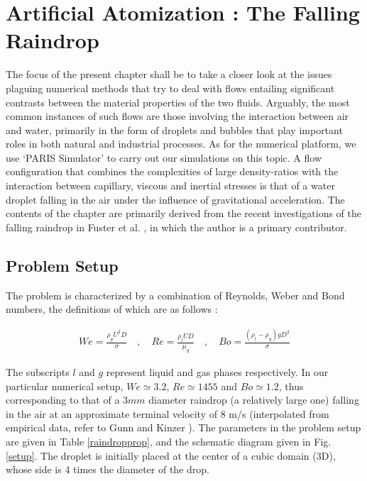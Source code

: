 \setchapterpreamble[u]{\margintoc}
\chapter{Artificial Atomization : The Falling Raindrop}

The focus of the present chapter shall be to take a closer look at the issues 
plaguing numerical methods that try to deal with flows 
entailing significant contrasts between the material 
properties of the two fluids. Arguably, the most common
instances of such flows are those involving the interaction
between air and water, primarily in the form of droplets and 
bubbles that play important roles in both natural and industrial processes. 
As for the numerical platform, we use `PARIS Simulator' 
to carry out our simulations on this topic. 
A flow configuration that combines the complexities of large 
density-ratios with the interaction between capillary, viscous and 
inertial stresses is that of a water droplet falling in the 
air under the influence of gravitational acceleration.
The contents of the chapter are primarily derived 
from the recent investigations of the falling raindrop  
in Fuster et al. , in which
the author is a primary contributor. 
\section{Problem Setup}

The problem is characterized by a combination of Reynolds, 
Weber and Bond numbers, the definitions of which are as follows : 

\begin{align}
We=\frac{\rho_{g} U^2 D}{\sigma} \quad,\quad Re= \frac{\rho_{l} U D}{\mu_{g}} \quad,\quad Bo=\frac{\left(\rho_{l}-\rho_{g}\right) g D^2 }{\sigma}
\end{align}

The subscripts $l$ and $g$ represent liquid and gas phases respectively. 
In our particular numerical setup, $We \simeq 3.2 $, $Re \simeq 1455 $ and $Bo \simeq 1.2 $, 
thus corresponding to that of a $3mm$ diameter raindrop (a relatively large one) 
falling in the air at an approximate terminal velocity of  
$8$ m/s (interpolated from empirical data, refer to Gunn and Kinzer \cite{gunn1949}). 
The parameters in the problem setup are given in Table \ref{raindropprop}, 
and the schematic diagram given in Fig. \ref{setup}. 
The droplet is initially placed at the center of a cubic domain (3D), 
whose side is 4 times the diameter of the drop. 

